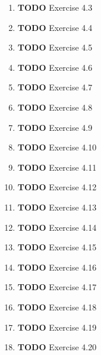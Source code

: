 \documentclass[11pt]{article}
\begin{document}
\begin{enumerate}
\begin{enumerate}
\item {\bfseries\sffamily TODO} Exercise 4.3
\label{sec:org70e8ed5}

\item {\bfseries\sffamily TODO} Exercise 4.4
\label{sec:orge61fd0c}

\item {\bfseries\sffamily TODO} Exercise 4.5
\label{sec:orgdef3dfa}

\item {\bfseries\sffamily TODO} Exercise 4.6
\label{sec:orgf23f2ad}

\item {\bfseries\sffamily TODO} Exercise 4.7
\label{sec:org72eb86e}

\item {\bfseries\sffamily TODO} Exercise 4.8
\label{sec:orgf9a349c}

\item {\bfseries\sffamily TODO} Exercise 4.9
\label{sec:org6492a21}

\item {\bfseries\sffamily TODO} Exercise 4.10
\label{sec:orgb7ea616}

\item {\bfseries\sffamily TODO} Exercise 4.11
\label{sec:orgdf72ac6}

\item {\bfseries\sffamily TODO} Exercise 4.12
\label{sec:org642921b}

\item {\bfseries\sffamily TODO} Exercise 4.13
\label{sec:org9762a65}

\item {\bfseries\sffamily TODO} Exercise 4.14
\label{sec:org6d858e4}

\item {\bfseries\sffamily TODO} Exercise 4.15
\label{sec:orgcec9a5c}

\item {\bfseries\sffamily TODO} Exercise 4.16
\label{sec:org5f10bd6}

\item {\bfseries\sffamily TODO} Exercise 4.17
\label{sec:org6237cf2}

\item {\bfseries\sffamily TODO} Exercise 4.18
\label{sec:org1522f6d}

\item {\bfseries\sffamily TODO} Exercise 4.19
\label{sec:orgd1d86cd}

\item {\bfseries\sffamily TODO} Exercise 4.20
\label{sec:org8bad2a1}


\end{enumerate}
\end{enumerate}
\end{document}
